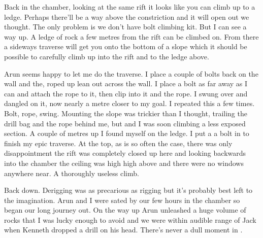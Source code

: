 Back in the chamber, looking at the same rift it looks like you can climb up to a ledge. Perhaps there'll be a way above the constriction and it will open out we thought. The only problem is we don't have bolt climbing kit. But I can see a way up. A ledge of rock a few metres from the rift can be climbed on. From there a sideways traverse will get you onto the bottom of a slope which it should be possible to carefully climb up into the rift and to the ledge above. 

Arun seems happy to let me do the traverse. I place a couple of bolts back on the wall and the, roped up lean out across the wall. I place a bolt as far away as I can and attach the rope to it, then clip into it and the rope. I swung over and dangled on it, now nearly a metre closer to my goal. I repeated this a few times. Bolt, rope, swing. Mounting the slope was trickier than I thought, trailing the drill bag and the rope behind me, but  and I was soon climbing a less exposed section. A couple of metres up I found myself on the ledge. I put a a bolt in to finish my epic traverse. At the top, as is so often the case, there was only disappointment the rift was completely closed up here and looking backwards into the chamber the ceiling was high high above and there were no windows anywhere near. A thoroughly useless climb. 

Back down. Derigging was as precarious as rigging but it's probably best left to the imagination. Arun and I were sated by our few hours in the chamber so began our long journey out. On the way up Arun unleashed a huge volume of rocks that I was lucky enough to avoid and we were within audible range of Jack when Kenneth dropped a drill on his head. There's never a dull moment in .



